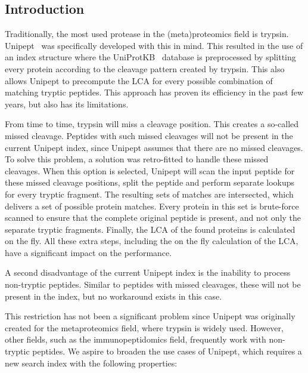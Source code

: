 \documentclass[11pt]{article}
\begin{document}
    \begin{multicols}{2}
        \section{Introduction}\label{sec:introduction}
        Traditionally, the most used protease in the (meta)proteomics field is trypsin.
        Unipept~\cite{unipept_desktop, unipept_api, unipept_4, unipept_orig, unipept_tutorial, unipept_web, unipept_cli, unipept_desktop_2} was specifically developed with this in mind.
        This resulted in the use of an index structure where the UniProtKB~\cite{UniprotKB} database is preprocessed by splitting every protein according to the cleavage pattern created by trypsin.
        This also allows Unipept to precompute the LCA for every possible combination of matching tryptic peptides.
        This approach has proven its efficiency in the past few years, but also has its limitations.

        From time to time, trypsin will miss a cleavage position.
        This creates a so-called missed cleavage.
        Peptides with such missed cleavages will not be present in the current Unipept index, since Unipept assumes that there are no missed cleavages.
        To solve this problem, a solution was retro-fitted to handle these missed cleavages.
        When this option is selected, Unipept will scan the input peptide for these missed cleavage positions, split the peptide and perform separate lookups for every tryptic fragment.
        The resulting sets of matches are intersected, which delivers a set of possible protein matches.
         Every protein in this set is brute-force scanned to ensure that the complete original peptide is present, and not only the separate tryptic fragments.
        Finally, the LCA of the found proteins is calculated on the fly.
        All these extra steps, including the on the fly calculation of the LCA, have a significant impact on the performance.

        A second disadvantage of the current Unipept index is the inability to process non-tryptic peptides.
        Similar to peptides with missed cleavages, these will not be present in the index, but no workaround exists in this case.

        This restriction has not been a significant problem since Unipept was originally created for the metaproteomics field, where trypsin is widely used.
        However, other fields, such as the immunopeptidomics field, frequently work with non-tryptic peptides.
        We aspire to broaden the use cases of Unipept, which requires a new search index with the following properties:


\end{multicols}
\end{document}
